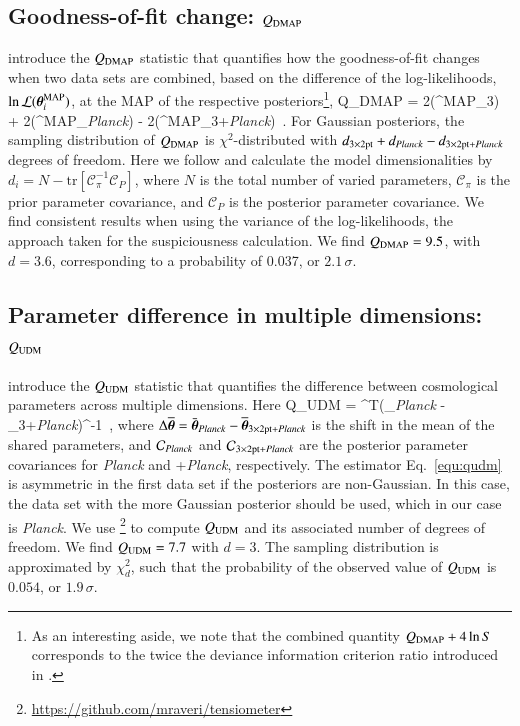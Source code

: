 \begin{appendix}
\subsection{Goodness-of-fit change: $Q_{\rm DMAP}$}
\label{app:QDMAP} 
\citet{Raveri2019} introduce the $Q_{\rm DMAP}$ statistic that quantifies how the goodness-of-fit changes when two data sets are combined, based on the difference of the log-likelihoods, $\ln\mathcal{L}(\vec\theta^{\rm MAP}_{i})$, at the MAP of the respective posteriors\footnote{As an interesting aside, we note that the combined quantity $Q_{\rm DMAP} + 4\ln S$ corresponds to the twice the deviance information criterion ratio introduced in \citet{joudaki/etal:2017}.},
\be
\label{eqn:QDMAP}
	Q_{\rm DMAP} =  2\ln{}(\vec\theta^{\rm MAP}_{\rm 3}) + 2\ln{}(\vec\theta^{\rm MAP}_{\it Planck}) - 2\ln{}(\vec\theta^{\rm MAP}_{{\rm 3+}{\it Planck}}) \,.
\ee
For Gaussian posteriors, the sampling distribution of $Q_{\rm DMAP}$ is $\chi^{2}$-distributed with $d_{\rm 3\times2pt} + d_{\it Planck} - d_{{\rm 3\times2pt+}{\it Planck}}$ degrees of freedom. 
Here we follow \citet{Raveri2019} and calculate the model dimensionalities by $d_{i} = N - \mathrm{tr}[\mathcal{C}_{\pi}^{-1}\mathcal{C}_{P}]$, where $N$ is the total number of varied parameters, $\mathcal{C}_{\pi}$ is the prior parameter covariance, and $\mathcal{C}_{P}$ is the posterior parameter covariance. 
We find consistent results when using the variance of the log-likelihoods, the approach taken for the suspiciousness calculation.
We find $Q_{\rm DMAP} = 9.5$, with $d=3.6$, corresponding to a probability of 0.037, or $2.1\, \sigma$. 


\subsection{Parameter difference in multiple dimensions: $Q_{\rm UDM}$} 
\label{app:QUDM} 
\citet{Raveri2019} introduce the $Q_{\rm UDM}$ statistic that quantifies the difference between cosmological parameters across multiple dimensions.   Here
\be
\label{equ:qudm}
	Q_{\rm UDM} = \Delta\overline{\vec\theta}^{T}(_{\it Planck} - _{{\rm 3+}{\it Planck}})^{-1}\Delta\overline{\vec\theta} \,,
\ee
where $\Delta\overline{\vec\theta} = \bar{\vec\theta}_{\it Planck} - \overline{\vec\theta}_{{\rm 3\times2pt+}{\it Planck}}$ is the shift in the mean of the shared parameters, and $\mathcal{C}_{\it Planck}$ and $\mathcal{C}_{{\rm 3\times2pt+}{\it Planck}}$ are the posterior parameter covariances for {\it Planck} and \tttp+{\it Planck}, respectively. 
The estimator Eq.~\eqref{equ:qudm} is asymmetric in the first data set if the posteriors are non-Gaussian. 
In this case, the data set with the more Gaussian posterior should be used, which in our case is {\it Planck}. 
We use \footnote{\url{https://github.com/mraveri/tensiometer}} to compute $Q_{\rm UDM}$ and its associated number of degrees of freedom. 
We find $Q_{\rm UDM} = 7.7$ with $d = 3$. The sampling distribution is approximated by $\chi^{2}_{d}$, such that the probability of the observed value of $Q_{\rm UDM} $ is $0.054$, or $1.9\,\sigma$. 




\end{appendix}
